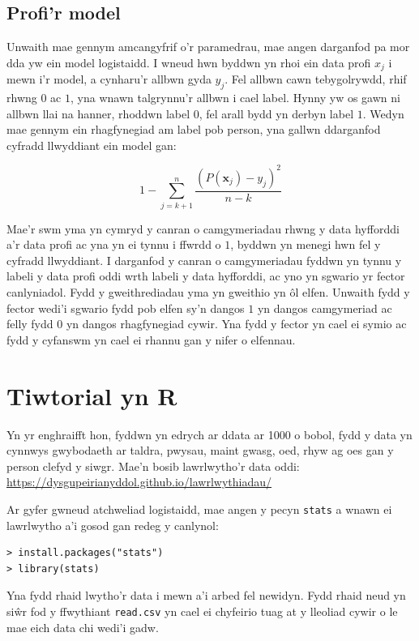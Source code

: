 \subsection{Profi'r model}

Unwaith mae gennym amcangyfrif o'r paramedrau, mae angen darganfod pa mor dda yw ein model logistaidd. I wneud hwn byddwn yn rhoi ein data profi $x_j$ i mewn i'r model, a cynharu'r allbwn gyda $y_j$. Fel allbwn cawn tebygolrywdd, rhif rhwng $0$ ac $1$, yna wnawn talgrynnu'r allbwn i cael label. Hynny yw os gawn ni allbwn llai na hanner, rhoddwn label $0$, fel arall bydd yn derbyn label $1$. Wedyn mae gennym ein rhagfynegiad am label pob person, yna gallwn ddarganfod cyfradd llwyddiant ein model gan:

\begin{equation}\label{eqn:cyfradd-llwyddiant}
 1 - \sum_{j = k+1}^{n} \frac{(P(\mathbf{x}_j) - y_j)^{2}}{n - k}
\end{equation}

Mae'r swm yma yn cymryd y canran o camgymeriadau rhwng y data hyfforddi a'r data profi ac yna yn ei tynnu i ffwrdd o $1$, byddwn yn menegi hwn fel y cyfradd llwyddiant. I darganfod y canran o camgymeriadau fyddwn yn tynnu y labeli y data profi oddi wrth labeli y data hyfforddi, ac yno yn sgwario yr fector canlyniadol. Fydd y gweithrediadau yma yn gweithio yn \^{o}l elfen. Unwaith fydd y fector wedi'i sgwario fydd pob elfen sy'n dangos $1$ yn dangos camgymeriad ac felly fydd $0$ yn dangos rhagfynegiad cywir. Yna fydd y fector yn cael ei symio ac fydd y cyfanswm yn cael ei rhannu gan y nifer o elfennau.

\section{Tiwtorial yn R}

Yn yr enghraifft hon, fyddwn yn edrych ar ddata ar 1000 o bobol, fydd y data yn cynnwys gwybodaeth ar taldra, pwysau, maint gwasg, oed, rhyw ag oes gan y person clefyd y siwgr. Mae'n bosib lawrlwytho'r data oddi: \url{https://dysgupeirianyddol.github.io/lawrlwythiadau/}

Ar gyfer gwneud atchweliad logistaidd, mae angen y pecyn \texttt{stats} a wnawn ei lawrlwytho a'i gosod gan redeg y canlynol:

\begin{verbatim}
> install.packages("stats")
> library(stats)
\end{verbatim}

Yna fydd rhaid lwytho'r data i mewn a'i arbed fel newidyn. Fydd rhaid neud yn si\^{w}r fod y ffwythiant \texttt{read.csv} yn cael ei chyfeirio tuag at y lleoliad cywir o le mae eich data chi wedi'i gadw.

